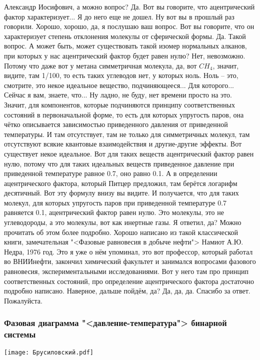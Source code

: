 \documentclass[main.tex]{subfiles}
\begin{document}
Александр Иосифович, а можно вопрос?
Да.
Вот вы говорите, что ацентрический фактор характеризует...
Я до него еще не дошел.
Ну вот вы в прошлый раз говорили.
Хорошо, хорошо, да, я послушаю ваш вопрос.
Вот вы говорите, что он характеризует степень отклонения молекулы от сферической формы.
Да.
Такой вопрос. А может быть, может существовать такой изомер нормальных алканов, при которых у нас ацентрический фактор будет равен нулю?
Нет, невозможно.
Потому что даже вот у метана симметричная молекула, да, вот $CH_4$, значит, видите, там 1/100, то есть таких углеводов нет, у которых ноль.
Ноль -- это, смотрите, это некое идеальное вещество, подчиняющееся...
Для которого...
Сейчас я вам, знаете, что...
Ну ладно, не буду, нет времени просто на это.
Значит, для компонентов, которые подчиняются принципу соответственных состояний в первоначальной форме, то есть для которых упругость паров, она чётко описывается зависимостью приведенного давления от приведенной температуры.
И там отсутствует, там не только для симметричных молекул, там отсутствуют всякие квантовые взаимодействия и другие-другие эффекты.
Вот существует некое идеальное.
Вот для таких веществ ацентрический фактор равен нулю, потому что для таких идеальных веществ приведенное давление при приведенной температуре равное 0.7, оно равно 0.1.
А в определении ацентрического фактора, который Питцер предложил, там берётся логарифм десятичный.
Вот эту формулу внизу вы видите.
И получается, что для таких молекул, для которых упругость паров при приведенной температуре 0.7 равняется 0.1, ацентрический фактор равен нулю.
Это молекулы, это не углеводороды, а это молекулы, вот как инертные газы.
Я ответил, да?
Можно прочитать об этом более подробно.
Хорошо написано из такой классической книги, замечательная "<Фазовые равновесия в добыче нефти"> Намиот А.Ю. Недра, 1976 год.
Это я уже о нём упоминал, это вот профессор, который работал во ВНИИнефти, закончил химический факультет и занимался вопросами фазового равновесия, экспериментальными исследованиями.
Вот у него там про принцип соответственных состояний, про определение ацентрического фактора достаточно подробно написано.
Наверное, дальше пойдём, да?
Да, да, да. Спасибо за ответ.
Пожалуйста.

\subsubsection{Фазовая диаграмма "<давление-температура"> бинарной системы}

\begin{center}
\texttt{[image: Брусиловский.pdf]}
\end{center}
\end{document}
